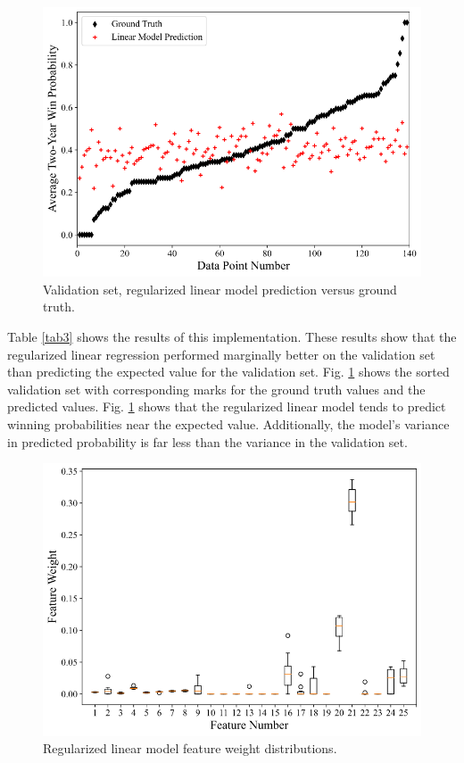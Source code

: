 \documentclass[conference]{IEEEtran}
\begin{document}
\begin{figure}[htbp]
\centerline{\includegraphics[width=1\linewidth]{test1.png}}
\caption{Validation set, regularized linear model prediction versus ground truth.}
\label{fig4}
\end{figure}

Table \ref{tab3} shows the results of this implementation. These results show that the regularized linear regression performed marginally better on the validation set than predicting the expected value for the validation set. Fig. \ref{fig4} shows the sorted validation set with corresponding marks for the ground truth values and the predicted values. Fig. \ref{fig4} shows that the regularized linear model tends to predict winning probabilities near the expected value. Additionally, the model's variance in predicted probability is far less than the variance in the validation set. 

\begin{figure}[htbp]
\centerline{\includegraphics[width=1\linewidth]{weight1.png}}
\caption{Regularized linear model feature weight distributions.}
\label{fig5}
\end{figure}
\end{document}
